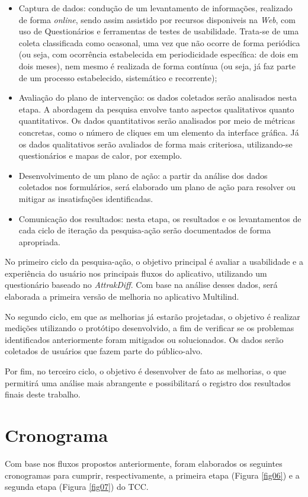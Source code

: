 \begin{itemize}
	\item Captura de dados: condução de um levantamento de informações, realizado de forma \textit{online}, sendo assim assistido por recursos disponiveis na \textit{Web}, com uso de Questionários e ferramentas de testes de usabilidade. Trata-se de uma coleta classificada como ocasonal, uma vez que não ocorre de forma periódica (ou seja, com ocorrência estabelecida em periodicidade específica: de dois em dois meses), nem mesmo é realizada de forma contínua (ou seja, já faz parte de um processo estabelecido, sistemático e recorrente);
	\item Avaliação do plano de intervenção: os dados coletados serão analisados nesta etapa. A abordagem da pesquisa envolve tanto aspectos qualitativos quanto quantitativos. Os dados quantitativos serão analisados por meio de métricas concretas, como o número de cliques em um elemento 
	da interface gráfica. Já os dados qualitativos serão avaliados de forma mais criteriosa, utilizando-se questionários e mapas de calor, por exemplo.
	\item Desenvolvimento de um plano de ação: a partir da análise dos dados coletados nos formulários, será elaborado um plano de ação para resolver ou mitigar as insatisfações identificadas.
	\item Comunicação dos resultados: nesta etapa, os resultados e os levantamentos de cada ciclo de iteração da pesquisa-ação serão documentados de forma apropriada.
\end{itemize}

No primeiro ciclo da pesquisa-ação, o objetivo principal é avaliar a usabilidade e a experiência do usuário nos principais fluxos do aplicativo, utilizando um questionário baseado no \textit{AttrakDiff}. Com base na análise desses dados, será elaborada a primeira versão de melhoria no aplicativo Multilind.

No segundo ciclo, em que as melhorias já estarão projetadas, o objetivo é realizar medições utilizando o protótipo desenvolvido, a fim de verificar se os problemas identificados anteriormente foram mitigados ou solucionados. Os dados serão 
coletados de usuários que fazem parte do público-alvo.

Por fim, no terceiro ciclo, o objetivo é desenvolver de fato as melhorias, o que permitirá uma análise mais abrangente e possibilitará o registro dos resultados finais deste trabalho.

\section{Cronograma}
\label{sec:Cronograma}
Com base nos fluxos propostos anteriormente, foram elaborados os seguintes cronogramas para cumprir, respectivamente, a primeira etapa (Figura \ref{fig06}) e a segunda etapa (Figura \ref{fig07}) do TCC.

